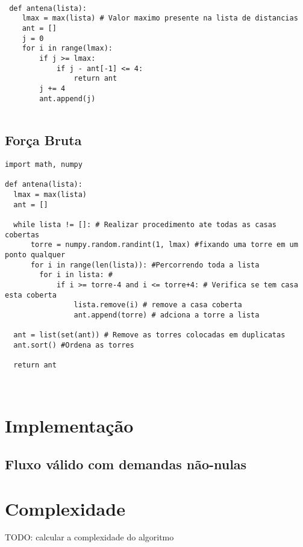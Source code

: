 \documentclass[11pt]{article}
\begin{document}
\begin{verbatim}
 
 def antena(lista):
    lmax = max(lista) # Valor maximo presente na lista de distancias
    ant = []
    j = 0
    for i in range(lmax): 
        if j >= lmax:
            if j - ant[-1] <= 4:
                return ant
        j += 4
        ant.append(j)
 
\end{verbatim}


\subsection{Força Bruta}

\label{sec-3-1}


\begin{verbatim}
import math, numpy

def antena(lista):
  lmax = max(lista)
  ant = []
  
  while lista != []: # Realizar procedimento ate todas as casas cobertas
      torre = numpy.random.randint(1, lmax) #fixando uma torre em um ponto qualquer
      for i in range(len(lista)): #Percorrendo toda a lista
        for i in lista: # 
            if i >= torre-4 and i <= torre+4: # Verifica se tem casa esta coberta
                lista.remove(i) # remove a casa coberta
                ant.append(torre) # adciona a torre a lista
  
  ant = list(set(ant)) # Remove as torres colocadas em duplicatas
  ant.sort() #Ordena as torres

  return ant
 
 
\end{verbatim}



\section{Implementação}
\label{sec-4}

\subsection{Fluxo válido com demandas não-nulas}
\label{sec-4-2}



\section{Complexidade}
\label{sec-5}

TODO: calcular a complexidade do algoritmo
\end{document}

